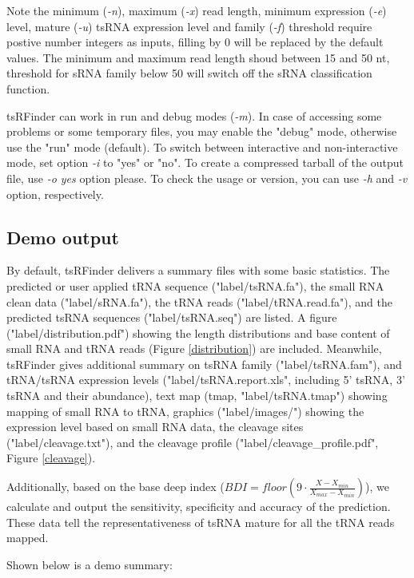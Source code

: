 \documentclass[11pt, a4paper]{article}
\begin{document}
Note the minimum (\emph{-n}), maximum (\emph{-x}) read length, minimum expression (\emph{-e}) level, mature (\emph{-u}) tsRNA expression level and family (\emph{-f}) threshold require postive number integers as inputs, filling by 0 will be replaced by the default values. The minimum and maximum read length shoud between 15 and 50 nt, threshold for sRNA family below 50 will switch off the sRNA classification function.

tsRFinder can work in run and debug modes (\emph{-m}). In case of accessing some problems or some temporary files, you may enable the "debug" mode, otherwise use the "run" mode (default). To switch between interactive and non-interactive mode, set option \emph{-i} to "yes" or "no". To create a compressed tarball of the output file, use \emph{-o yes} option please. To check the usage or version, you can use \emph{-h} and \emph{-v} option, respectively.

\subsection{Demo output}

By default, tsRFinder delivers a summary files with some basic statistics. The predicted or user applied tRNA sequence ("label/tsRNA.fa"), the small RNA clean data ("label/sRNA.fa"), the tRNA reads ("label/tRNA.read.fa"), and the predicted tsRNA sequences ("label/tsRNA.seq") are listed. A figure ("label/distribution.pdf") showing the length distributions and base content of small RNA and tRNA reads (Figure \ref{distribution}) are included. Meanwhile, tsRFinder gives additional summary on tsRNA family ("label/tsRNA.fam"), and tRNA/tsRNA expression levels ("label/tsRNA.report.xls", including 5' tsRNA, 3' tsRNA and their abundance), text map (tmap, "label/tsRNA.tmap") showing mapping of small RNA to tRNA, graphics ("label/images/") showing the expression level based on small RNA data, the cleavage sites ("label/cleavage.txt"), and the cleavage profile ("label/cleavage\_profile.pdf", Figure \ref{cleavage}).

Additionally, based on the base deep index ($ BDI = floor (9 \cdot \frac{X-X_{min}}{X_{max}-X_{min}}) $), we calculate and output the sensitivity, specificity and accuracy of the prediction.  These data tell the representativeness of tsRNA mature for all the tRNA reads mapped.

Shown below is a demo summary:
\end{document}

